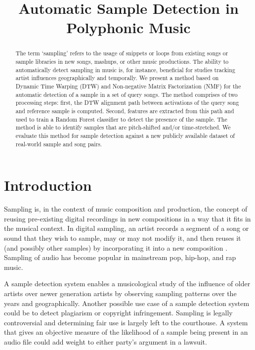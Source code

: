 \documentclass{article}
\title{Automatic Sample Detection in Polyphonic Music}
\begin{document}
%
\maketitle
%
\begin{abstract}
The term `sampling' refers to the usage of snippets or loops from existing songs or sample libraries in new songs, mashups, or other music productions. The ability to automatically detect sampling in music is, for instance, beneficial for studies tracking artist influences geographically and temporally. We present a method based on Dynamic Time Warping (DTW) and Non-negative Matrix Factorization (NMF) for the automatic detection of a sample in a set of query songs. The method comprises of two processing steps: first, the DTW alignment path between activations of the query song and reference sample is computed. Second, features are extracted from this path and used to train a Random Forest classifier to detect the presence of the sample. The method is able to identify samples that are pitch-shifted and/or time-stretched. We evaluate this method for sample detection against a new publicly available dataset of real-world sample and song pairs.
\end{abstract}
%
\section{Introduction}
\label{sec:intro}

Sampling is, in the context of music composition and production, the concept of reusing pre-existing digital recordings in new compositions in a way that it fits in the musical context. In digital sampling, an artist records a segment of a song or sound that they wish to sample, may or may not modify it, and then reuses it (and possibly other samples) by incorporating it into a new composition \cite{katz_capturing_2004}. Sampling of audio has become popular in mainstream pop, hip-hop, and rap music. 

A sample detection system enables a musicological study of the influence of older artists over newer generation artists by observing sampling patterns over the years and geographically.
%
Another possible use case of a sample detection system could be to detect plagiarism or copyright infringement. Sampling is legally controversial and determining fair use is largely left to the courthouse. A system that gives an objective measure of the likelihood of a sample being present in an audio file could add weight to either party's argument in a lawsuit.
\end{document}
